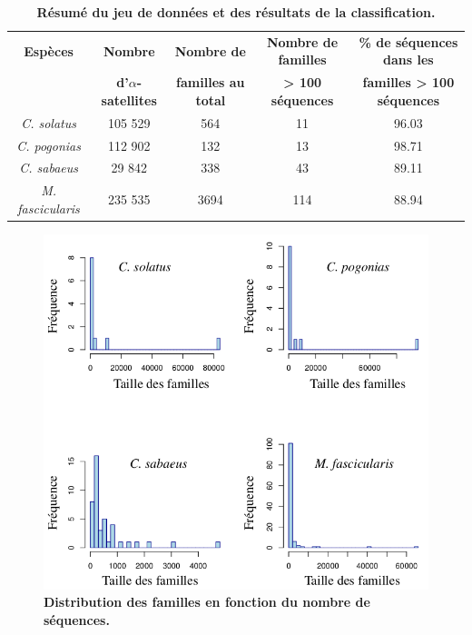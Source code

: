 \documentclass[12pt,a4paper]{article}
\begin{document}
		\begin{table}
			\caption{\textbf{Résumé du jeu de données et des résultats de la classification.}}
			\center
			\begin{tabular}{|c|c|c|c|c|}
   			\hline
  			\textbf{Espèces} & \textbf{Nombre } & \textbf{Nombre de } & \textbf{Nombre de familles} & \textbf{\%  de séquences dans les}\\
  			 & \textbf{d'$\alpha$-satellites } & \textbf{familles au total} & \textbf{ > 100 séquences} & \textbf{familles > 100 séquences}\\
  		    \hline
   			\textit{C. solatus} & 105 529 & 564 & 11 & 96.03  \\
   			\hline
    		\textit{C. pogonias} & 112 902 & 132 & 13 & 98.71\\
   			\hline
   			\textit{C. sabaeus} & 29 842 & 338 & 43 & 89.11\\
   			\hline
   			\textit{M. fascicularis} & 235 535 & 3694 & 114 & 88.94\\
   			\hline			
			\end{tabular}			
			\label{tab_res}
		\end{table}		
		
		\begin{figure}
			\center
			\includegraphics[scale=0.45]{img/distribution_familles.png}
			\caption{\textbf{Distribution des familles en fonction du nombre de séquences.}}
			\label{dist_fam} 
		\end{figure}
		
\end{document}
